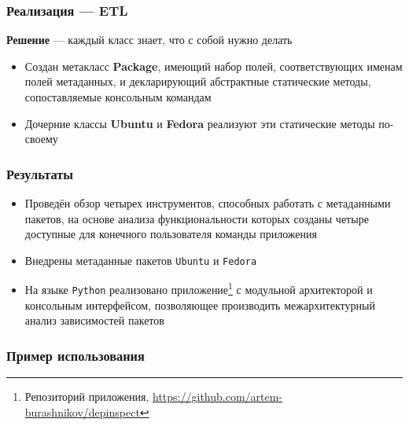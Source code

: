 \documentclass{beamer}
\begin{document}
\begin{frame}[t]
	\frametitle{Реализация --- ETL}
	\textbf{Решение} --- каждый класс знает, что с собой нужно делать
	\begin{itemize}
		\item Создан метакласс \textbf{Package}, имеющий набор полей, соответствующих именам полей метаданных, и декларирующий абстрактные статические методы, сопоставляемые консольным командам
		\item Дочерние классы \textbf{Ubuntu} и \textbf{Fedora} реализуют эти статические методы по-своему
	\end{itemize}
\end{frame}

\begin{frame}
	\frametitle{Результаты}
	\begin{itemize}
		\item Проведён обзор четырех инструментов, способных работать с метаданными пакетов, на основе анализа функциональности которых созданы четыре доступные для конечного пользователя команды приложения
		\item Внедрены метаданные пакетов \texttt{Ubuntu} и \texttt{Fedora}
		\item На языке \texttt{Python} реализовано приложение\footnote{Репозиторий приложения, \href{https://github.com/artem-burashnikov/depinspect}{https://github.com/artem-burashnikov/depinspect}} с модульной архитекторой и консольным интерфейсом, позволяющее производить межархитектурный анализ зависимостей пакетов
	\end{itemize}
\end{frame}

\appendix

\begin{frame}
	\frametitle{Пример использования}
	\begin{figure}[ht]
		\raggedright
		
	\end{figure}
\end{frame}
\end{document}
